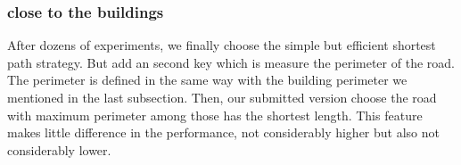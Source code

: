 \subsubsection{close to the buildings}
After dozens of experiments, we finally choose the simple but efficient shortest path strategy. But add an second key which is measure the perimeter of the road. The perimeter is defined in the same way with the building perimeter we mentioned in the last subsection. Then, our submitted version choose the road with maximum perimeter among those has the shortest length. This feature makes little difference in the performance, not considerably higher but also not considerably lower.
